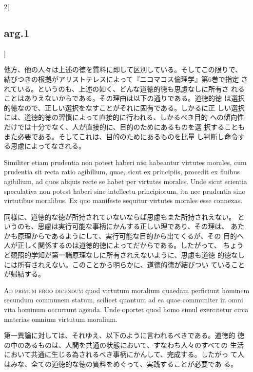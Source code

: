 \documentclass[paper=a4paper,fontsize=10pt,jafontsize=9pt,titlepage]{jlreq}
\begin{document}
\begin{paracol}{2}[\subsection{arg.1}]
\switchcolumn

他方、他の人々は上述の徳を質料に即して区別している。そしてこの限りで、
 結びつきの根拠がアリストテレスによって『ニコマコス倫理学』第6巻で指定
 されている。というのも、上述の如く、どんな道徳的徳も思慮なしに所有さ
 れることはありえないからである。その理由は以下の通りである。道徳的徳
 は選択的徳なので、正しい選択をなすことがそれに固有である。しかるに正
 しい選択には、道徳的徳の習慣によって直接的に行われる、しかるべき目的
 への傾向性だけでは十分でなく、人が直接的に、目的のためにあるものを選
 択することもまた必要である。そしてこれは、目的のためにあるものを比量
 し判断し命令する思慮によってなされる。

\switchcolumn*

Similiter etiam prudentia non potest haberi nisi habeantur virtutes
 morales, cum prudentia sit recta ratio agibilium, quae, sicut ex
 principiis, procedit ex finibus agibilium, ad quos aliquis recte se
 habet per virtutes morales. Unde sicut scientia speculativa non
 potest haberi sine intellectu principiorum, ita nec prudentia sine
 virtutibus moralibus. Ex quo manifeste sequitur virtutes morales esse
 connexas.

\switchcolumn

同様に、道徳的な徳が所持されていないならば思慮もまた所持されえない。
 というのも、思慮は実行可能な事柄にかんする正しい理であり、その理は、
 あたかも原理からであるようにして、実行可能な目的から出てくるが、その
 目的へ人が正しく関係するのは道徳的徳によってだからである。したがって、
 ちょうど観照的学知が第一諸原理なしに所有されえないように、思慮も道徳
 的徳なしには所有されえない。このことから明らかに、道徳的徳が結びつい
 ていることが帰結する。

\switchcolumn*[\subsection{ad.1}]

{\scshape Ad primum ergo dicendum} quod virtutum moralium quaedam
perficiunt hominem secundum communem statum, scilicet quantum ad ea
quae communiter in omni vita hominum occurrunt agenda. Unde oportet
quod homo simul exercitetur circa materias omnium virtutum
 moralium.

\switchcolumn

第一異論に対しては、それゆえ、以下のように言われるべきである。道徳的
 徳の中のあるものは、人間を共通の状態において、すなわち人々のすべての
 生活において共通に生じる為されるべき事柄にかんして、完成する。したがっ
 て人はみな、全ての道徳的な徳の質料をめぐって、実践することが必要であ
 る。


\end{paracol}
\end{document}

